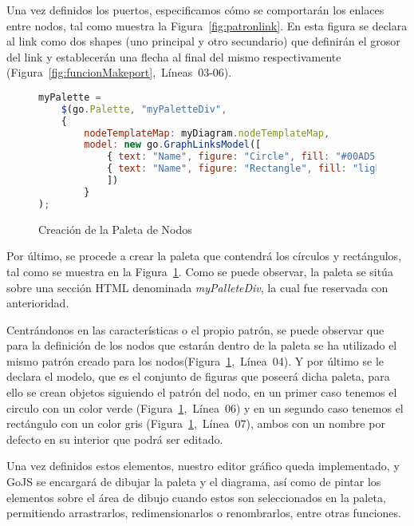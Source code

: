 Una vez definidos los puertos, especificamos cómo se comportarán los enlaces entre nodos, tal como muestra la Figura~\ref{fig:patronlink}. En esta figura se declara al link como dos shapes (uno principal y otro secundario) que definirán el grosor del link y establecerán una flecha al final del mismo respectivamente (Figura~\ref{fig:funcionMakeport},~Líneas~03-06).


\begin{figure}[!tb]
	\centering
\begin{lstlisting}[language=JavaScript]
myPalette =
	$(go.Palette, "myPaletteDiv",  
	{
		nodeTemplateMap: myDiagram.nodeTemplateMap,  
		model: new go.GraphLinksModel([  
			{ text: "Name", figure: "Circle", fill: "#00AD5F" },
			{ text: "Name", figure: "Rectangle", fill: "lightgray" }
			])
		}
);
\end{lstlisting}
\caption{Creación de la Paleta de Nodos}
\label{fig:paletaNodos}
\end{figure}

Por último, se procede a crear la paleta que contendrá los círculos y rectángulos, tal como se muestra en la Figura~\ref{fig:paletaNodos}. Como se puede observar, la paleta se sitúa sobre una sección HTML denominada \emph{myPalleteDiv}, la cual fue reservada con anterioridad. 

Centrándonos en las características o el propio patrón, se puede observar que para la definición de los nodos que estarán dentro de la paleta se ha utilizado el mismo patrón creado para los nodos(Figura~\ref{fig:paletaNodos},~Línea~04). Y por último se le declara el modelo, que es el conjunto de figuras que poseerá dicha paleta, para ello se crean objetos siguiendo el patrón del nodo, en un primer caso tenemos el circulo con un color verde (Figura~\ref{fig:paletaNodos},~Línea~06) y en un segundo caso tenemos el rectángulo con un color gris (Figura~\ref{fig:paletaNodos},~Línea~07), ambos con un nombre por defecto en su interior que podrá ser editado.


Una vez definidos estos elementos, nuestro editor gráfico queda implementado, y GoJS se encargará de dibujar la paleta y el diagrama, así como de pintar los elementos sobre el área de dibujo cuando estos son seleccionados en la paleta, permitiendo arrastrarlos, redimensionarlos o renombrarlos, entre otras funciones. 
